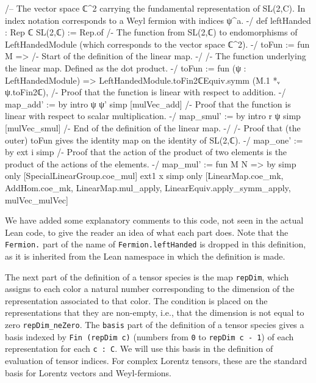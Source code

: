 \documentclass[a4paper, 11pt]{article}
\DeclareRobustCommand{\myinline}{\lstinline}
\begin{document}
\begin{codeLong}
/-- The vector space ℂ^2 carrying the fundamental representation of SL(2,C).
  In index notation corresponds to a Weyl fermion with indices ψ^a. -/
def leftHanded : Rep ℂ SL(2,ℂ) := Rep.of {
  /- The function from SL(2,ℂ) to endomorphisms of LeftHandedModule 
    (which corresponds to the vector space ℂ^2). -/
  toFun := fun M => {
    /- Start of the definition of the linear map. -/
    /- The function underlying the linear map. Defined as the dot product. -/
    toFun := fun (ψ : LeftHandedModule) =>
      LeftHandedModule.toFin2ℂEquiv.symm (M.1 *ᵥ ψ.toFin2ℂ),
    /- Proof that the function is linear with respect to addition. -/
    map_add' := by
      intro ψ ψ'
      simp [mulVec_add]
    /- Proof that the function is linear with respect to scalar multiplication. -/
    map_smul' := by
      intro r ψ
      simp [mulVec_smul]
    /- End of the definition of the linear map. -/}
  /- Proof that (the outer) toFun gives the identity map on the identity of SL(2,ℂ). -/
  map_one' := by
    ext i
    simp
  /- Proof that the action of the product of two elements is 
    the product of the actions of the elements. -/
  map_mul' := fun M N => by
    simp only [SpecialLinearGroup.coe_mul]
    ext1 x
    simp only [LinearMap.coe_mk, AddHom.coe_mk, LinearMap.mul_apply, LinearEquiv.apply_symm_apply,
      mulVec_mulVec]}
\end{codeLong} 
We have added some explanatory comments to this code, not seen in the actual Lean code, to give 
the reader an idea of what each part does. Note that the \myinline|Fermion.| part of the name 
of \myinline|Fermion.leftHanded| is dropped in this definition, as it is inherited from 
the Lean namespace in which the definition is made.

The next part of the definition of a tensor species is the map \myinline|repDim|, which assigns to each color a natural number
corresponding to the dimension of the representation associated to that color. The condition is placed on the representations that they are non-empty, i.e., 
that the dimension is not equal to zero \myinline|repDim_neZero|.  
The \myinline|basis| part of the definition of a tensor species gives a basis indexed by \myinline|Fin (repDim c)| 
(numbers from \myinline|0| to \myinline|repDim c - 1|)  of each representation for each \myinline|c : C|.  
We will use this basis in the definition of evaluation of tensor indices. For complex Lorentz tensors, 
these are the standard basis for Lorentz vectors and Weyl-fermions. 
\end{document}
